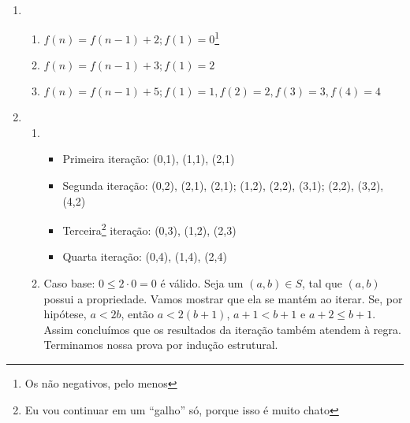 \documentclass{article}
\begin{document}
\begin{enumerate}
\begin{enumerate}
	      \end{enumerate}

	\item

	      \begin{enumerate}

		      \item \( f(n) = f(n-1) + 2; f(1) = 0\)\footnote{Os não negativos,
			            pelo menos}

		      \item \( f(n) = f(n-1) + 3; f(1) = 2\)

		      \item \( f(n) = f(n-1) + 5; f(1) = 1, f(2) = 2, f(3) = 3, f(4) =
		            4\)

	      \end{enumerate}

	\item

	      \begin{enumerate}

		      \item \begin{itemize}

			            \item Primeira iteração: (0,1), (1,1), (2,1)

			            \item Segunda iteração: (0,2), (2,1), (2,1); (1,2),
			                  (2,2), (3,1); (2,2), (3,2), (4,2) \item
			                  Terceira\footnote{Eu vou continuar em um ``galho''
				                  só, porque isso é muito chato} iteração: (0,3),
			                  (1,2), (2,3)

			            \item Quarta iteração: (0,4), (1,4), (2,4)

		            \end{itemize}

		      \item Caso base: \( 0 \leq 2 \cdot 0 = 0 \) é válido. Seja um \(
		            (a,b) \in S \), tal que \( (a,b) \) possui a propriedade.
		            Vamos mostrar que ela se mantém ao iterar. Se, por hipótese,
		            \( a < 2b \), então \( a < 2(b+1) \), \( a + 1 < b + 1 \) e \(
		            a + 2 \leq b + 1 \). Assim concluímos que os resultados da
		            iteração também atendem à regra. Terminamos nossa prova por
		            indução estrutural.


\end{enumerate}
\end{enumerate}
\end{document}

